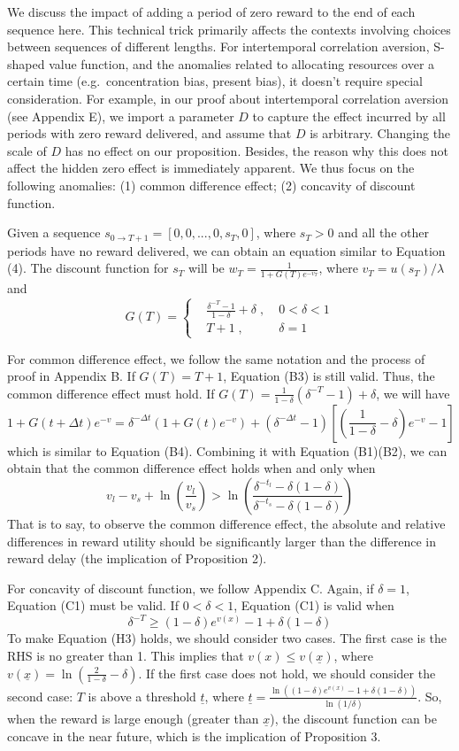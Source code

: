 We discuss the impact of adding a period of zero reward to the end of
each sequence here. This technical trick primarily affects the contexts
involving choices between sequences of different lengths. For
intertemporal correlation aversion, S-shaped value function, and the
anomalies related to allocating resources over a certain time
(e.g.~concentration bias, present bias), it doesn't require special
consideration. For example, in our proof about intertemporal correlation
aversion (see Appendix E), we import a parameter \(D\) to capture the
effect incurred by all periods with zero reward delivered, and assume
that \(D\) is arbitrary. Changing the scale of \(D\) has no effect on
our proposition. Besides, the reason why this does not affect the hidden
zero effect is immediately apparent. We thus focus on the following
anomalies: (1) common difference effect; (2) concavity of discount
function.

Given a sequence \(s_{0\rightarrow T+1}=[0,0,...,0,s_T,0]\), where
\(s_T>0\) and all the other periods have no reward delivered, we can
obtain an equation similar to Equation (4). The discount function for
\(s_T\) will be \(w_T=\frac{1}{1+G(T)e^{-v_T}}\), where
\(v_T=u(s_T)/\lambda\) and \[\tag{H1}
G(T)=\left\{
\begin{aligned}
& \frac{\delta^{-T}-1}{1-\delta}+\delta \;,&\; 0<\delta<1 \\
& T+1 \;,&\; \delta=1
\end{aligned}
\right.
\]

For common difference effect, we follow the same notation and the
process of proof in Appendix B. If \(G(T)=T+1\), Equation (B3) is still
valid. Thus, the common difference effect must hold. If
\(G(T)=\frac{1}{1-\delta}(\delta^{-T}-1)+\delta\), we will
have\[\tag{H2}
1+G(t+\Delta t)e^{-v}=
\delta^{-\Delta t}(1+G(t)e^{-v})+(\delta^{-\Delta t}-1)[(\frac{1}{1-\delta}-\delta)e^{-v}-1]
\]which is similar to Equation (B4). Combining it with Equation
(B1)(B2), we can obtain that the common difference effect holds when and
only when\[
v_l-v_s+\ln\left(\frac{v_l}{v_s}\right)>
\ln\left(\frac{\delta^{-t_l}-\delta(1-\delta)}{\delta^{-t_s}-\delta(1-\delta)}\right)
\]That is to say, to observe the common difference effect, the absolute
and relative differences in reward utility should be significantly
larger than the difference in reward delay (the implication of
Proposition 2).

For concavity of discount function, we follow Appendix C. Again, if
\(\delta=1\), Equation (C1) must be valid. If \(0<\delta<1\), Equation
(C1) is valid when\[\tag{H3}
\delta^{-T}\geq (1-\delta)e^{v(x)}-1+\delta(1-\delta)
\]To make Equation (H3) holds, we should consider two cases. The first
case is the RHS is no greater than 1. This implies that
\(v(x)\leq v(\underline{x})\), where
\(v(\underline{x})=\ln(\frac{2}{1-\delta}-\delta)\). If the first case
does not hold, we should consider the second case: \(T\) is above a
threshold \(\underline{t}\), where
\(\underline{t}=\frac{\ln((1-\delta)e^{v(x)}-1+\delta(1-\delta))}{\ln(1/\delta)}\).
So, when the reward is large enough (greater than \(\underline{x}\)),
the discount function can be concave in the near future, which is the
implication of Proposition 3.
